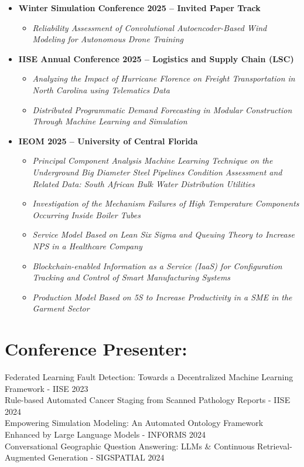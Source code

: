 \documentclass[10pt, letterpaper]{article}
\begin{document}
\begin{itemize}
    \item \textbf{Winter Simulation Conference 2025 – Invited Paper Track}
    \begin{itemize}
        \item \textit{Reliability Assessment of Convolutional Autoencoder-Based Wind Modeling for Autonomous Drone Training}
    \end{itemize}

    \item \textbf{IISE Annual Conference 2025 – Logistics and Supply Chain (LSC)}
    \begin{itemize}
        \item \textit{Analyzing the Impact of Hurricane Florence on Freight Transportation in North Carolina using Telematics Data}
        \item \textit{Distributed Programmatic Demand Forecasting in Modular Construction Through Machine Learning and Simulation}
    \end{itemize}

    \item \textbf{IEOM 2025 – University of Central Florida}
    \begin{itemize}
        \item \textit{Principal Component Analysis Machine Learning Technique on the Underground Big Diameter Steel Pipelines Condition Assessment and Related Data: South African Bulk Water Distribution Utilities}
        \item \textit{Investigation of the Mechanism Failures of High Temperature Components Occurring Inside Boiler Tubes}
        \item \textit{Service Model Based on Lean Six Sigma and Queuing Theory to Increase NPS in a Healthcare Company}
        \item \textit{Blockchain-enabled Information as a Service (IaaS) for Configuration Tracking and Control of Smart Manufacturing Systems}
        \item \textit{Production Model Based on 5S to Increase Productivity in a SME in the Garment Sector}
    \end{itemize}
\end{itemize}


\section{Conference Presenter:}
Federated Learning Fault Detection: Towards a Decentralized Machine Learning Framework - IISE 2023\\
\vspace{0.3cm}
Rule-based Automated Cancer Staging from Scanned Pathology Reports - IISE 2024\\
\vspace{0.3cm}
Empowering Simulation Modeling: An Automated Ontology Framework Enhanced by Large Language Models - INFORMS 2024\\
\vspace{0.3cm}
Conversational Geographic Question Answering: LLMs \& Continuous Retrieval-Augmented Generation - SIGSPATIAL 2024\\
\vspace{0.3cm}
\break
\end{document}
